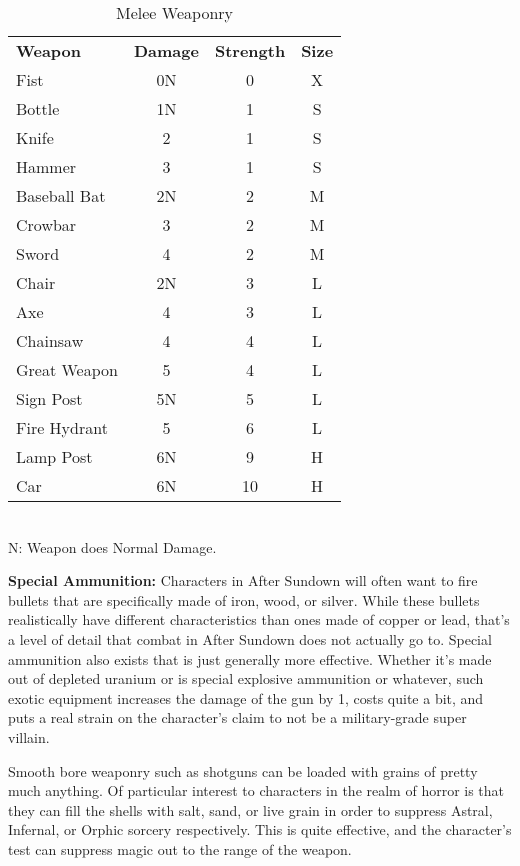 \begin{wraptable}[19]{R}{8.3cm}\vspace{-.5cm}
 \caption{Melee Weaponry} \centering
\begin{tabular}{l c c c}
\textbf{Weapon}&\textbf{Damage}&\textbf{Strength}&\textbf{Size}\\
Fist & 0N & 0 & X\\
Bottle & 1N & 1 & S\\
Knife & 2 & 1 & S\\
Hammer & 3 & 1 & S\\
Baseball Bat & 2N & 2 & M\\
Crowbar & 3 & 2 & M\\
Sword & 4 & 2 & M\\
Chair & 2N & 3 & L\\
Axe & 4 & 3 & L\\
Chainsaw & 4 & 4 & L\\
Great Weapon & 5 & 4 & L\\
Sign Post & 5N & 5 & L\\
Fire Hydrant & 5 & 6 & L\\
Lamp Post & 6N & 9 & H\\
Car & 6N & 10 & H\\
\end{tabular}\\
N: Weapon does Normal Damage.
\end{wraptable}

\textbf{Special Ammunition:} Characters in After Sundown will often want to fire bullets that are specifically made of iron, wood, or silver. While these bullets realistically have different characteristics than ones made of copper or lead, that's a level of detail that combat in After Sundown does not actually go to. Special ammunition also exists that is just generally more effective. Whether it's made out of depleted uranium or is special explosive ammunition or whatever, such exotic equipment increases the damage of the gun by 1, costs quite a bit, and puts a real strain on the character's claim to not be a military-grade super villain.

Smooth bore weaponry such as shotguns can be loaded with grains of pretty much anything. Of particular interest to characters in the realm of horror is that they can fill the shells with salt, sand, or live grain in order to suppress Astral, Infernal, or Orphic sorcery respectively. This is quite effective, and the character's  test can suppress magic out to the range of the weapon.

